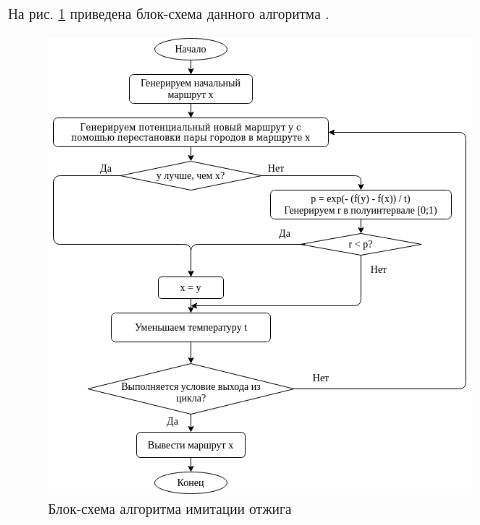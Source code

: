 \documentclass[12pt, a4paper]{article}
\begin{document}
На рис. \ref{fig1} приведена блок-схема данного алгоритма \cite{researchgateblock}.
\begin{figure}[!h]
	\begin{center}
		\includegraphics[scale=0.42]{Untitled_Diagram}
		\caption{Блок-схема алгоритма имитации отжига}
		\label{fig1}
	\end{center}
\end{figure}

\end{document}
